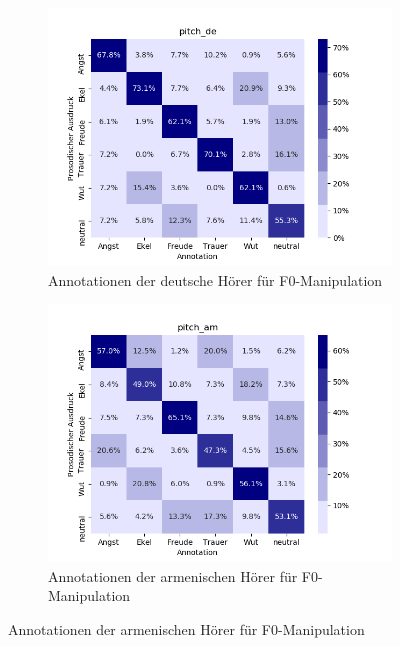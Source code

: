 \documentclass[11pt,a4paper,headsepline,twoside,toc=bibliography]{scrreprt}
\begin{document}
\begin{figure}[t!]
	\medskip
	\begin{subfigure}{0.48\textwidth}
		\includegraphics[width=\linewidth]{plots/heatmap/conf_pitch_de.png}
		\caption{Annotationen der deutsche Hörer für F0-Manipulation} \label{fig:conf_pitch_de}
	\end{subfigure}\hspace*{\fill}
	\begin{subfigure}{0.48\textwidth}
		\includegraphics[width=\linewidth]{plots/heatmap/conf_pitch_am.png}
		\caption{Annotationen der armenischen Hörer für F0-Manipulation} \label{fig:conf_pitch_am}
	\end{subfigure}
	

\end{figure}
\end{document}
